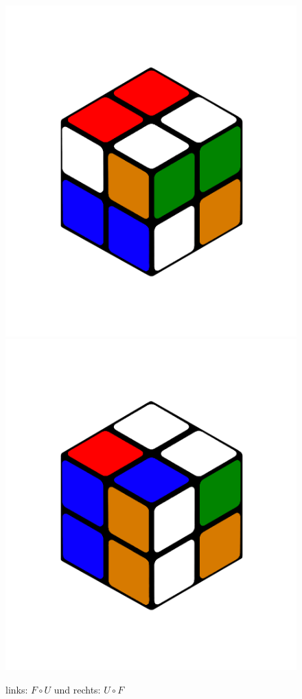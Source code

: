 \documentclass[12pt,a4paper, usenames, dvipsnames]{scrartcl}
\begin{document}
\begin{figure}[h]
\centering
\includegraphics[scale=0.1]{UpAfterFront.png}
\includegraphics[scale=0.1]{FrontAfterUp.png}
\caption{links: $F \circ U$ und rechts: $U \circ F$}
\end{figure}
\end{document}
